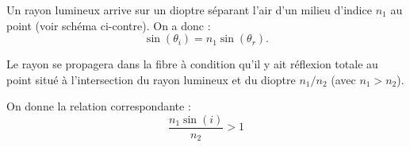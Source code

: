 	
	
	
	\finEntrainement
	
		
	
	\hauteurLargeurCadreReponse		{8mm}{5cm}
	\typeEntrainement				{} %
	\initialisationEntrainement
	
	
	\initialisationPartieGauche %
	Un rayon lumineux arrive sur un dioptre séparant l'air d'un milieu d'indice $n_1$ au point \ptA (voir schéma ci-contre). On a donc :
	\begin{equation}
	\label{Snell}
	\sin(\theta_i)=n_1\sin(\theta_r).
	\end{equation}
	
	Le rayon se propagera dans la fibre à condition qu'il y ait réflexion totale au point \ptI situé à l'intersection 
	du rayon lumineux et du dioptre $n_1/n_2$ (avec $n_1>n_2$).
	
	On donne la relation correspondante : 
	\begin{equation}
	\label{condition}
	\frac{n_1 \sin(i)}{n_2}>1
	\end{equation}
	
